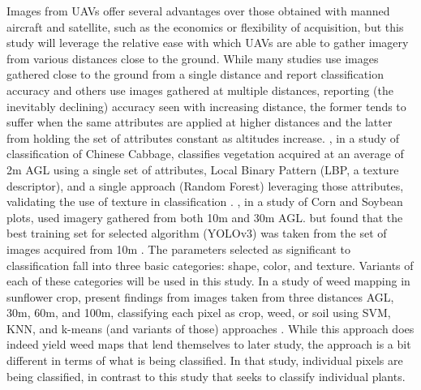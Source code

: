 \documentclass[letterpaper]{article}
\begin{document}
 Images from UAVs offer several advantages over those obtained with manned aircraft and satellite, such as the economics or flexibility of acquisition, but this study will leverage the relative ease with which UAVs are able to gather imagery from various distances close to the ground. While many studies use images gathered close to the ground from a single distance and report classification accuracy and others use images gathered at multiple distances, reporting (the inevitably declining) accuracy seen with increasing distance, the former tends to suffer when the same attributes are applied at higher distances and the latter from holding the set of attributes constant as altitudes increase. \citeauthor{Ong2023-lm}, in a study of classification of Chinese Cabbage, classifies vegetation acquired at an average of 2m AGL using a single set of attributes, Local Binary Pattern (LBP, a texture descriptor), and a single approach (Random Forest) leveraging those attributes, validating the use of texture in classification \parencite{Ong2023-lm}. \citeauthor{Etienne2021-ik}, in a study of Corn and Soybean plots, used imagery gathered from both 10m and 30m AGL. but found that the best training set for selected algorithm (YOLOv3) was taken from the set of images acquired from 10m \parencite{Etienne2021-ik}. The parameters selected as significant to classification fall into three basic categories: shape, color, and texture. Variants of each of these categories will be used in this study. 
In a study of weed mapping in sunflower crop, \citeauthor{Perez-Ortiz2015-yk} present findings from images taken from three distances AGL, 30m, 60m, and 100m, classifying each pixel as crop, weed, or soil using SVM, KNN, and k-means (and variants of those) approaches \parencite{Perez-Ortiz2015-yk}. While this approach does indeed yield weed maps that lend themselves to later study, the approach is a bit different in terms of what is being classified. In that study, individual pixels are being classified, in contrast to this study that seeks to classify individual plants.
\end{document}
